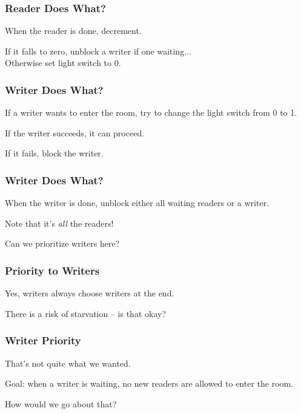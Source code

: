 \begin{frame}
\frametitle{Reader Does What?}

When the reader is done, decrement.

If it falls to zero, unblock a writer if one waiting...\\
\quad Otherwise set light switch to 0.

\end{frame}

\begin{frame}
\frametitle{Writer Does What?}

If a writer wants to enter the room, try to change the light switch from 0 to 1. 

If the writer succeeds, it can proceed. 

If it fails, block the writer. 

\end{frame}

\begin{frame}
\frametitle{Writer Does What?}

When the writer is done, unblock either all waiting readers or a writer. 


Note that it's \textit{all} the readers!

Can we prioritize writers here?

\end{frame}

\begin{frame}
\frametitle{Priority to Writers}

Yes, writers always choose writers at the end.

There is a risk of starvation -- is that okay?

\end{frame}

\begin{frame}
\frametitle{Writer Priority}

That's not quite what we wanted. 

Goal: when a writer is waiting, no new readers are allowed to enter the room. 

How would we go about that? 

\end{frame}

